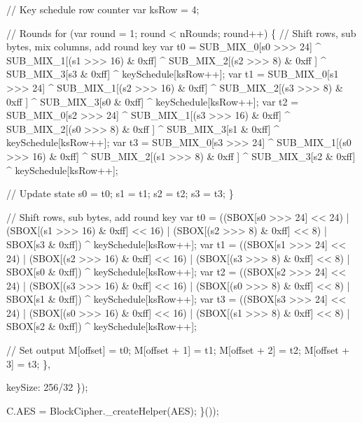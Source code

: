 \begin{DoxyCodeInclude}
            \textcolor{comment}{// Key schedule row counter}
            var ksRow = 4;

            \textcolor{comment}{// Rounds}
            \textcolor{keywordflow}{for} (var round = 1; round < nRounds; round++) \{
                \textcolor{comment}{// Shift rows, sub bytes, mix columns, add round key}
                var t0 = SUB\_MIX\_0[s0 >>> 24] ^ SUB\_MIX\_1[(s1 >>> 16) & 0xff] ^ SUB\_MIX\_2[(s2 >>> 8) & 0xff
      ] ^ SUB\_MIX\_3[s3 & 0xff] ^ keySchedule[ksRow++];
                var t1 = SUB\_MIX\_0[s1 >>> 24] ^ SUB\_MIX\_1[(s2 >>> 16) & 0xff] ^ SUB\_MIX\_2[(s3 >>> 8) & 0xff
      ] ^ SUB\_MIX\_3[s0 & 0xff] ^ keySchedule[ksRow++];
                var t2 = SUB\_MIX\_0[s2 >>> 24] ^ SUB\_MIX\_1[(s3 >>> 16) & 0xff] ^ SUB\_MIX\_2[(s0 >>> 8) & 0xff
      ] ^ SUB\_MIX\_3[s1 & 0xff] ^ keySchedule[ksRow++];
                var t3 = SUB\_MIX\_0[s3 >>> 24] ^ SUB\_MIX\_1[(s0 >>> 16) & 0xff] ^ SUB\_MIX\_2[(s1 >>> 8) & 0xff
      ] ^ SUB\_MIX\_3[s2 & 0xff] ^ keySchedule[ksRow++];

                \textcolor{comment}{// Update state}
                s0 = t0;
                s1 = t1;
                s2 = t2;
                s3 = t3;
            \}

            \textcolor{comment}{// Shift rows, sub bytes, add round key}
            var t0 = ((SBOX[s0 >>> 24] << 24) | (SBOX[(s1 >>> 16) & 0xff] << 16) | (SBOX[(s2 >>> 8) & 0xff]
       << 8) | SBOX[s3 & 0xff]) ^ keySchedule[ksRow++];
            var t1 = ((SBOX[s1 >>> 24] << 24) | (SBOX[(s2 >>> 16) & 0xff] << 16) | (SBOX[(s3 >>> 8) & 0xff]
       << 8) | SBOX[s0 & 0xff]) ^ keySchedule[ksRow++];
            var t2 = ((SBOX[s2 >>> 24] << 24) | (SBOX[(s3 >>> 16) & 0xff] << 16) | (SBOX[(s0 >>> 8) & 0xff]
       << 8) | SBOX[s1 & 0xff]) ^ keySchedule[ksRow++];
            var t3 = ((SBOX[s3 >>> 24] << 24) | (SBOX[(s0 >>> 16) & 0xff] << 16) | (SBOX[(s1 >>> 8) & 0xff]
       << 8) | SBOX[s2 & 0xff]) ^ keySchedule[ksRow++];

            \textcolor{comment}{// Set output}
            M[offset]     = t0;
            M[offset + 1] = t1;
            M[offset + 2] = t2;
            M[offset + 3] = t3;
        \},

        keySize: 256/32
    \});

    C.AES = BlockCipher.\_createHelper(AES);
\}());
\end{DoxyCodeInclude}
 
